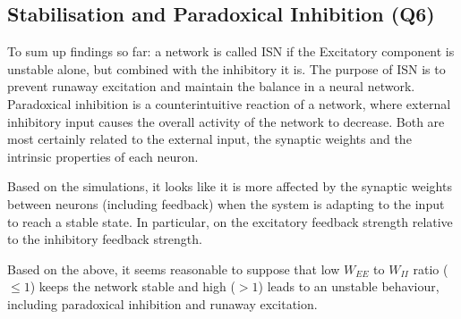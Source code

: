 \documentclass[10pt,twocolumn]{article}
\begin{document}
\subsection{Stabilisation and Paradoxical Inhibition (Q6)}
To sum up findings so far: a network is called ISN if the Excitatory component is unstable
alone, but combined with the inhibitory it is.
The purpose of ISN is to prevent runaway excitation and
maintain the balance in a neural network. Paradoxical inhibition is
a counterintuitive reaction of a network, where external inhibitory input
causes the overall activity of the network to decrease.
Both are most certainly related to the external input, the synaptic weights
and the intrinsic properties of each neuron. 

Based on the simulations, it looks like it is more
affected by the synaptic weights between neurons (including feedback)
 when the system is adapting to the input to reach a stable state. 
In particular, on the excitatory feedback strength relative to the 
inhibitory feedback strength.

Based on the above, it seems reasonable to suppose that 
low $W_{EE}$ to $W_{II}$ ratio ($\le1$)  keeps the network stable and 
high ($>1$) leads to an unstable behaviour, including paradoxical 
inhibition and runaway excitation.
\end{document}
